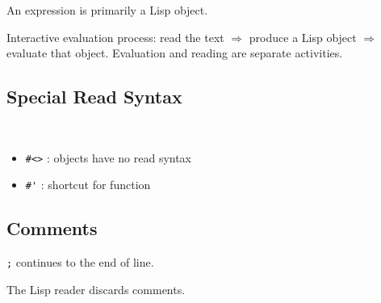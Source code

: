 \documentclass{article}
\begin{document}
An expression is primarily a Lisp object.

Interactive evaluation process: read the text $\Rightarrow$ produce a Lisp object $\Rightarrow$ evaluate that object. Evaluation and reading are separate activities.

\subsection{Special Read Syntax}
\begin{definition}~
    \begin{itemize}
        \item \verb|#<>| : objects have no read syntax
        \item \verb|#'| : shortcut for function
    \end{itemize}
\end{definition}

\subsection{Comments}
\begin{definition}[comment]
    \verb|;| continues to the end of line.
\end{definition}

The Lisp reader discards comments.
\end{document}
